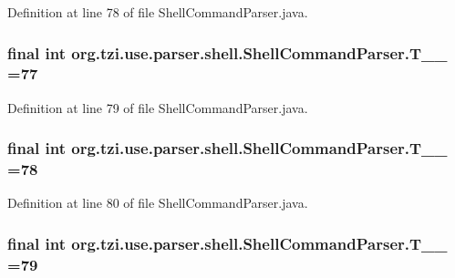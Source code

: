 Definition at line 78 of file Shell\-Command\-Parser.\-java.

\hypertarget{classorg_1_1tzi_1_1use_1_1parser_1_1shell_1_1_shell_command_parser_a92a6892d9a8e16a8fd2a4116397c71ba}{
\subsubsection[{T\-\_\-\-\_\-77}]{\setlength{\rightskip}{0pt plus 5cm}final int org.\-tzi.\-use.\-parser.\-shell.\-Shell\-Command\-Parser.\-T\-\_\-\-\_ =77\hspace{0.3cm}{\ttfamily [static]}}}\label{classorg_1_1tzi_1_1use_1_1parser_1_1shell_1_1_shell_command_parser_a92a6892d9a8e16a8fd2a4116397c71ba}


Definition at line 79 of file Shell\-Command\-Parser.\-java.

\hypertarget{classorg_1_1tzi_1_1use_1_1parser_1_1shell_1_1_shell_command_parser_acda743fd568ebbc46be1d1b5ea696e30}{
\subsubsection[{T\-\_\-\-\_\-78}]{\setlength{\rightskip}{0pt plus 5cm}final int org.\-tzi.\-use.\-parser.\-shell.\-Shell\-Command\-Parser.\-T\-\_\-\-\_ =78\hspace{0.3cm}{\ttfamily [static]}}}\label{classorg_1_1tzi_1_1use_1_1parser_1_1shell_1_1_shell_command_parser_acda743fd568ebbc46be1d1b5ea696e30}


Definition at line 80 of file Shell\-Command\-Parser.\-java.

\hypertarget{classorg_1_1tzi_1_1use_1_1parser_1_1shell_1_1_shell_command_parser_a0c21dd977d4d9594bee75cdb2e380939}{
\subsubsection[{T\-\_\-\-\_\-79}]{\setlength{\rightskip}{0pt plus 5cm}final int org.\-tzi.\-use.\-parser.\-shell.\-Shell\-Command\-Parser.\-T\-\_\-\-\_ =79\hspace{0.3cm}{\ttfamily [static]}}}\label{classorg_1_1tzi_1_1use_1_1parser_1_1shell_1_1_shell_command_parser_a0c21dd977d4d9594bee75cdb2e380939}


